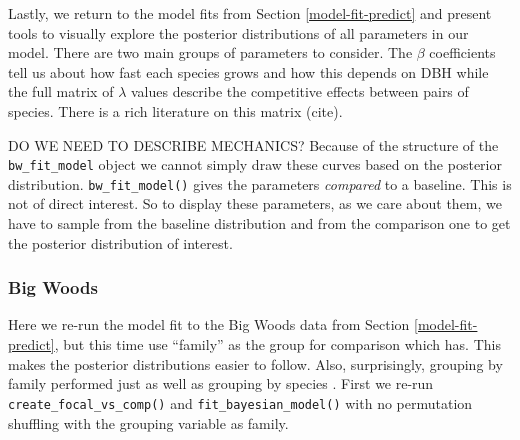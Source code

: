 \documentclass[12pt]{article}
\newenvironment{Shaded}{\begin{snugshade}}{\end{snugshade}}
\newcommand{\DataTypeTok}[1]{\textcolor[rgb]{0.13,0.29,0.53}{#1}}
\newcommand{\KeywordTok}[1]{\textcolor[rgb]{0.13,0.29,0.53}{\textbf{#1}}}
\newcommand{\NormalTok}[1]{#1}
\newcommand{\OperatorTok}[1]{\textcolor[rgb]{0.81,0.36,0.00}{\textbf{#1}}}
\newcommand{\OtherTok}[1]{\textcolor[rgb]{0.56,0.35,0.01}{#1}}
\newcommand{\StringTok}[1]{\textcolor[rgb]{0.31,0.60,0.02}{#1}}
\begin{document}
Lastly, we return to the model fits from Section \ref{model-fit-predict}
and present tools to visually explore the posterior distributions of all
parameters in our model. There are two main groups of parameters to
consider. The \(\beta\) coefficients tell us about how fast each species
grows and how this depends on DBH while the full matrix of \(\lambda\)
values describe the competitive effects between pairs of species. There
is a rich literature on this matrix (cite).

DO WE NEED TO DESCRIBE MECHANICS? Because of the structure of the
\texttt{bw\_fit\_model} object we cannot simply draw these curves based
on the posterior distribution. \texttt{bw\_fit\_model()} gives the
parameters \emph{compared} to a baseline. This is not of direct
interest. So to display these parameters, as we care about them, we have
to sample from the baseline distribution and from the comparison one to
get the posterior distribution of interest.

\hypertarget{big-woods-6}{%
\subsubsection{Big Woods}\label{big-woods-6}}

Here we re-run the model fit to the Big Woods data from Section
\ref{model-fit-predict}, but this time use ``family'' as the group for
comparison which has. This makes the posterior distributions easier to
follow. Also, surprisingly, grouping by family performed just as well as
grouping by species \citet{allen_permutation_2020}. First we re-run
\texttt{create\_focal\_vs\_comp()} and \texttt{fit\_bayesian\_model()}
with no permutation shuffling with the grouping variable as family.

\begin{Shaded}
\end{Shaded}
\end{document}

